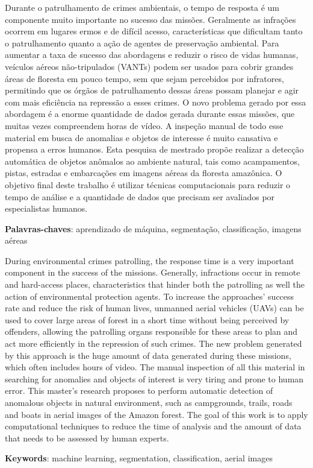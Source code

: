 \begin{resumo}
    Durante o patrulhamento de crimes ambientais, o tempo de resposta é um componente muito importante no sucesso das missões. Geralmente as infrações ocorrem em lugares ermos e de difícil acesso, características que dificultam tanto o patrulhamento quanto a ação de agentes de preservação ambiental. Para aumentar a taxa de sucesso das abordagens e reduzir o risco de vidas humanas, veículos aéreos não-tripulados (VANTs) podem ser usados para cobrir grandes áreas de floresta em pouco tempo, sem que sejam percebidos por infratores, permitindo que os órgãos de patrulhamento dessas áreas possam planejar e agir com mais eficiência na repressão a esses crimes. O novo problema gerado por essa abordagem é a enorme quantidade de dados gerada durante essas missões, que muitas vezes compreendem horas de vídeo. A inspeção manual de todo esse material em busca de anomalias e objetos de interesse é muito cansativa e propensa a erros humanos. Esta pesquisa de mestrado propõe realizar a detecção automática de objetos anômalos ao ambiente natural, tais como acampamentos, pistas, estradas e embarcações em imagens aéreas da floresta amazônica. O objetivo final deste trabalho é utilizar técnicas computacionais para reduzir o tempo de análise e a quantidade de dados que precisam ser avaliados por especialistas humanos.

    \vspace{\onelineskip}
    \noindent
    \textbf{Palavras-chaves}: aprendizado de máquina, segmentação, classificação, imagens aéreas
\end{resumo}

\begin{resumo}[Abstract]
    During environmental crimes patrolling, the response time is a very important component in the success of the missions. Generally, infractions occur in remote and hard-access places, characteristics that hinder both the patrolling as well the action of environmental protection agents. To increase the approaches' success rate and reduce the risk of human lives, unmanned aerial vehicles (UAVs) can be used to cover large areas of forest in a short time without being perceived by offenders, allowing the patrolling organs responsible for these areas to plan and act more efficiently in the repression of such crimes. The new problem generated by this approach is the huge amount of data generated during these missions, which often includes hours of video. The manual inspection of all this material in searching for anomalies and objects of interest is very tiring and prone to human error. This master's research proposes to perform automatic detection of anomalous objects in natural environment, such as campgrounds, trails, roads and boats in aerial images of the Amazon forest. The goal of this work is to apply computational techniques to reduce the time of analysis and the amount of data that needs to be assessed by human experts.
    
    \vspace{\onelineskip}
    \noindent
    \textbf{Keywords}: machine learning, segmentation, classification, aerial images
\end{resumo}
